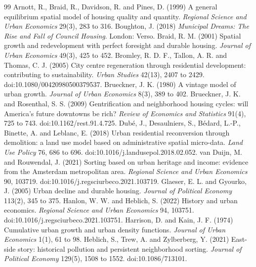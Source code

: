 \begin{thebibliography}{99}\small
{} Arnott, R., Braid, R., Davidson, R. and Pines, D. (1999) A general equilibrium spatial model of housing quality and quantity. \textit{Regional Science and Urban Economics} 29(3), 283 to 316.
 Boughton, J. (2018) \textit{Municipal Dreams: The Rise and Fall of Council Housing}. London: Verso.
 Braid, R. M. (2001) Spatial growth and redevelopment with perfect foresight and durable housing. \textit{Journal of Urban Economics} 49(3), 425 to 452.
 Bromley, R. D. F., Tallon, A. R. and Thomas, C. J. (2005) City centre regeneration through residential development: contributing to sustainability. \textit{Urban Studies} 42(13), 2407 to 2429. doi:10.1080/00420980500379537.
 Brueckner, J. K. (1980) A vintage model of urban growth. \textit{Journal of Urban Economics} 8(3), 389 to 402.
 Brueckner, J. K. and Rosenthal, S. S. (2009) Gentrification and neighborhood housing cycles: will America's future downtowns be rich? \textit{Review of Economics and Statistics} 91(4), 725 to 743. doi:10.1162/rest.91.4.725.
 Dub\'e, J., Desaulniers, S., B\'edard, L.-P., Binette, A. and Leblanc, E. (2018) Urban residential reconversion through demolition: a land use model based on administrative spatial micro-data. \textit{Land Use Policy} 76, 686 to 696. doi:10.1016/j.landusepol.2018.02.052.
 van Duijn, M. and Rouwendal, J. (2021) Sorting based on urban heritage and income: evidence from the Amsterdam metropolitan area. \textit{Regional Science and Urban Economics} 90, 103719. doi:10.1016/j.regsciurbeco.2021.103719.
 Glaeser, E. L. and Gyourko, J. (2005) Urban decline and durable housing. \textit{Journal of Political Economy} 113(2), 345 to 375.
 Hanlon, W. W. and Heblich, S. (2022) History and urban economics. \textit{Regional Science and Urban Economics} 94, 103751. doi:10.1016/j.regsciurbeco.2021.103751.
 Harrison, D. and Kain, J. F. (1974) Cumulative urban growth and urban density functions. \textit{Journal of Urban Economics} 1(1), 61 to 98.
 Heblich, S., Trew, A. and Zylberberg, Y. (2021) East-side story: historical pollution and persistent neighborhood sorting. \textit{Journal of Political Economy} 129(5), 1508 to 1552. doi:10.1086/713101.

\end{thebibliography}
